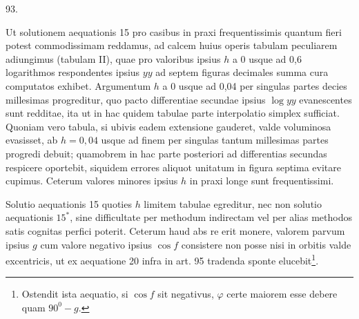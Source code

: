 \par{}\medskip
\hypertarget{native-126-article093}{}
\begin{center}93.\end{center}
Ut solutionem aequationis 15 pro casibus in praxi frequentissimis quantum fieri potest commodissimam reddamus, ad calcem huius operis tabulam peculiarem adiungimus (tabulam II), quae pro valoribus ipsius $h$ a 0 usque ad 0,6 logarithmos respondentes ipsius $yy$ ad septem figuras decimales summa cura computatos exhibet. Argumentum $h$ a 0 usque ad 0,04 per singulas partes decies millesimas progreditur, quo pacto differentiae secundae ipsius $\log yy$ evanescentes sunt redditae, ita ut in hac quidem tabulae parte interpolatio simplex sufficiat. Quoniam vero tabula, si ubivis eadem extensione gauderet, valde voluminosa evasisset, ab $h=0{,}04$ usque ad finem per singulas tantum millesimas partes progredi debuit; quamobrem in hac parte posteriori ad differentias secundas respicere oportebit, siquidem errores aliquot unitatum in figura septima evitare cupimus. Ceterum valores minores ipsius $h$ in praxi longe sunt frequentissimi.

Solutio aequationis 15 quoties $h$ limitem tabulae egreditur, nec non solutio aequationis $15^{\ast}$, sine difficultate per methodum indirectam vel per alias methodos satis cognitas perfici poterit. Ceterum haud abs re erit monere, valorem parvum ipsius $g$ cum valore negativo ipsius $\cos f$ consistere non posse nisi in orbitis valde excentricis, ut ex aequatione 20 infra in art. 95 tradenda sponte elucebit\footnote{Ostendit ista aequatio, si $\cos f$ sit negativus, $\varphi$ certe maiorem esse debere quam $90^0-g$.}.
